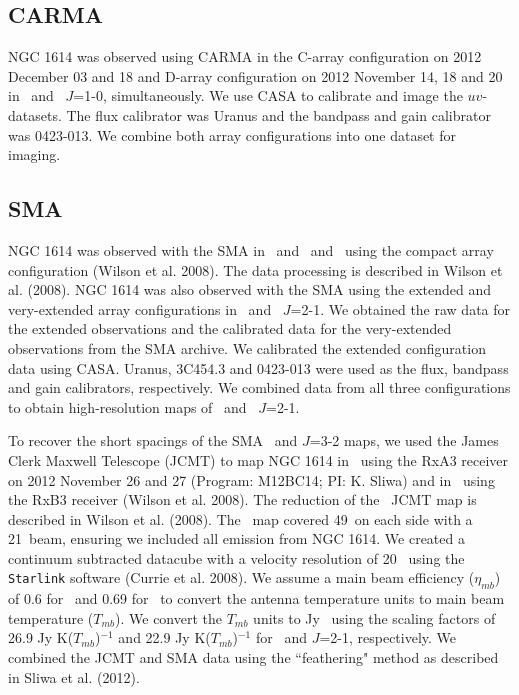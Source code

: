 \subsection{CARMA}
NGC 1614 was observed using CARMA in the C-array configuration on 2012 December 03 and 18 and D-array configuration on 2012 November 14, 18 and 20 in \co\ and \tco\ $J$=1-0, simultaneously. We use CASA to calibrate and image the $uv$-datasets. The flux calibrator was Uranus and the bandpass and gain calibrator was 0423-013. We combine both array configurations into one dataset for imaging. 

\subsection{SMA}

NGC 1614 was observed with the SMA in \co\ and \tcotwo\ and \cothree\ using the compact array configuration (Wilson et al. 2008). The data processing is described in Wilson et al. (2008). NGC 1614 was also observed with the SMA using the extended and very-extended \citep{Konig2013} array configurations in \co\ and \tco\ $J$=2-1. We obtained the raw data for the extended observations and the calibrated data for the very-extended observations from the SMA archive. We calibrated the extended configuration data using CASA. Uranus, 3C454.3 and 0423-013 were used as the flux, bandpass and gain calibrators, respectively. We combined data from all three configurations to obtain high-resolution maps of \co\ and \tco\ $J$=2-1.  

To recover the short spacings of the SMA \cotwo\ and $J$=3-2 maps, we used the James Clerk Maxwell Telescope (JCMT) to map NGC 1614 in \cotwo\ using the RxA3 receiver on 2012 November 26 and 27 (Program: M12BC14; PI: K. Sliwa) and in \cothree\ using the RxB3 receiver (Wilson et al. 2008). The reduction of the \cothree\ JCMT map is described in Wilson et al. (2008). The \cotwo\ map covered 49\arcsec\ on each side with a 21\arcsec\ beam, ensuring we included all emission from NGC 1614. We created a continuum subtracted datacube with a velocity resolution of 20 \kms\ using the \verb!Starlink! software (Currie et al. 2008)\nocite{Currie2008}. We assume a main beam efficiency ($\eta_{mb}$) of 0.6 for \cothree\ and 0.69 for \cotwo\ to convert the antenna temperature units to main beam temperature ($T_{mb}$). We convert the $T_{mb}$ units to Jy \kms\ using the scaling factors of 26.9 Jy K($T_{mb}$)$^{-1}$ and 22.9 Jy K($T_{mb}$)$^{-1}$ for \cothree\ and $J$=2-1, respectively. We combined the JCMT and SMA data using the ``feathering" method as described in Sliwa et al. (2012)\nocite{Sliwa2012}. 

